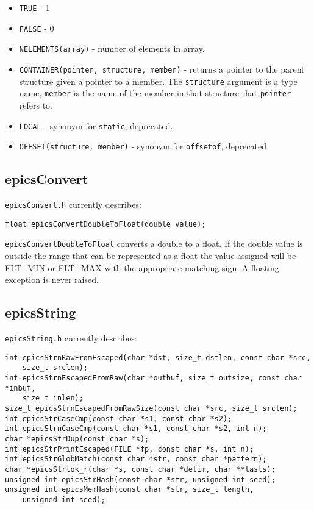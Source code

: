 \begin{itemize}

\item \verb|TRUE| - 1

\item \verb|FALSE| - 0

\item \verb|NELEMENTS(array)| - number of elements in array.

\item \verb|CONTAINER(pointer, structure, member)| - returns a pointer to the parent structure given a pointer to a member. The \verb|structure| argument is a type name, \verb|member| is the name of the member in that structure that \verb|pointer| refers to.

\item \verb|LOCAL| - synonym for \verb|static|, deprecated.

\item \verb|OFFSET(structure, member)| - synonym for \verb|offsetof|, deprecated.

\end{itemize}

\subsection{epicsConvert}

\verb|epicsConvert.h| currently describes:

\begin{verbatim}
float epicsConvertDoubleToFloat(double value);
\end{verbatim}

\verb|epicsConvertDoubleToFloat| converts a double to a float.
If the double value is outside the range that can be represented as a float the value assigned will be FLT\_MIN or FLT\_MAX with the appropriate matching sign.
A floating exception is never raised.

\subsection{epicsString}

\verb|epicsString.h| currently describes:

\begin{verbatim}
int epicsStrnRawFromEscaped(char *dst, size_t dstlen, const char *src,
    size_t srclen);
int epicsStrnEscapedFromRaw(char *outbuf, size_t outsize, const char *inbuf,
    size_t inlen);
size_t epicsStrnEscapedFromRawSize(const char *src, size_t srclen);
int epicsStrCaseCmp(const char *s1, const char *s2);
int epicsStrnCaseCmp(const char *s1, const char *s2, int n);
char *epicsStrDup(const char *s);
int epicsStrPrintEscaped(FILE *fp, const char *s, int n);
int epicsStrGlobMatch(const char *str, const char *pattern);
char *epicsStrtok_r(char *s, const char *delim, char **lasts);
unsigned int epicsStrHash(const char *str, unsigned int seed);
unsigned int epicsMemHash(const char *str, size_t length,
    unsigned int seed);
\end{verbatim}

